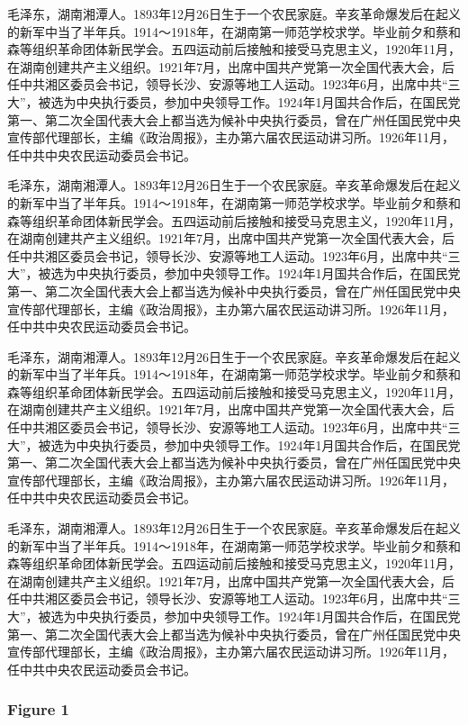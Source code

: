 \documentclass[]{article}
\begin{document}
毛泽东，湖南湘潭人。1893年12月26日生于一个农民家庭。辛亥革命爆发后在起义的新军中当了半年兵。1914～1918年，在湖南第一师范学校求学。毕业前夕和蔡和森等组织革命团体新民学会。五四运动前后接触和接受马克思主义，1920年11月，在湖南创建共产主义组织。1921年7月，出席中国共产党第一次全国代表大会，后任中共湘区委员会书记，领导长沙、安源等地工人运动。1923年6月，出席中共``三大''，被选为中央执行委员，参加中央领导工作。1924年1月国共合作后，在国民党第一、第二次全国代表大会上都当选为候补中央执行委员，曾在广州任国民党中央宣传部代理部长，主编《政治周报》，主办第六届农民运动讲习所。1926年11月，任中共中央农民运动委员会书记。

毛泽东，湖南湘潭人。1893年12月26日生于一个农民家庭。辛亥革命爆发后在起义的新军中当了半年兵。1914～1918年，在湖南第一师范学校求学。毕业前夕和蔡和森等组织革命团体新民学会。五四运动前后接触和接受马克思主义，1920年11月，在湖南创建共产主义组织。1921年7月，出席中国共产党第一次全国代表大会，后任中共湘区委员会书记，领导长沙、安源等地工人运动。1923年6月，出席中共``三大''，被选为中央执行委员，参加中央领导工作。1924年1月国共合作后，在国民党第一、第二次全国代表大会上都当选为候补中央执行委员，曾在广州任国民党中央宣传部代理部长，主编《政治周报》，主办第六届农民运动讲习所。1926年11月，任中共中央农民运动委员会书记。

毛泽东，湖南湘潭人。1893年12月26日生于一个农民家庭。辛亥革命爆发后在起义的新军中当了半年兵。1914～1918年，在湖南第一师范学校求学。毕业前夕和蔡和森等组织革命团体新民学会。五四运动前后接触和接受马克思主义，1920年11月，在湖南创建共产主义组织。1921年7月，出席中国共产党第一次全国代表大会，后任中共湘区委员会书记，领导长沙、安源等地工人运动。1923年6月，出席中共``三大''，被选为中央执行委员，参加中央领导工作。1924年1月国共合作后，在国民党第一、第二次全国代表大会上都当选为候补中央执行委员，曾在广州任国民党中央宣传部代理部长，主编《政治周报》，主办第六届农民运动讲习所。1926年11月，任中共中央农民运动委员会书记。

毛泽东，湖南湘潭人。1893年12月26日生于一个农民家庭。辛亥革命爆发后在起义的新军中当了半年兵。1914～1918年，在湖南第一师范学校求学。毕业前夕和蔡和森等组织革命团体新民学会。五四运动前后接触和接受马克思主义，1920年11月，在湖南创建共产主义组织。1921年7月，出席中国共产党第一次全国代表大会，后任中共湘区委员会书记，领导长沙、安源等地工人运动。1923年6月，出席中共``三大''，被选为中央执行委员，参加中央领导工作。1924年1月国共合作后，在国民党第一、第二次全国代表大会上都当选为候补中央执行委员，曾在广州任国民党中央宣传部代理部长，主编《政治周报》，主办第六届农民运动讲习所。1926年11月，任中共中央农民运动委员会书记。

\subsubsection{Figure 1}
\end{document}
